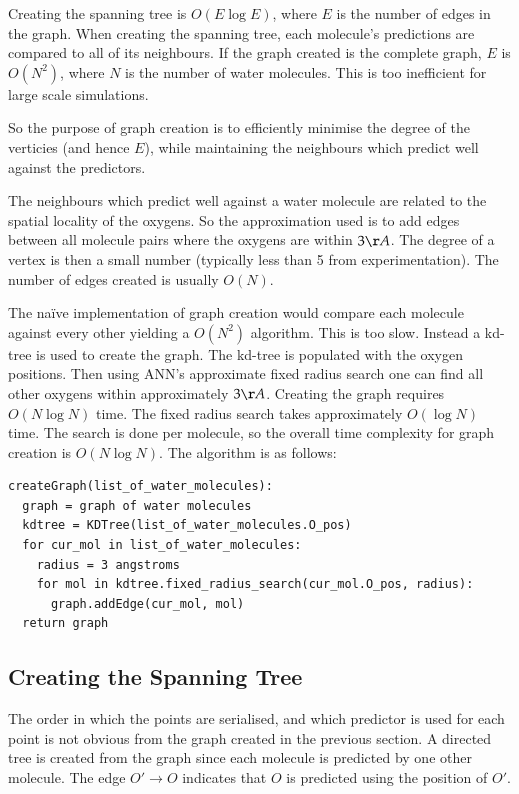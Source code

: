 \documentclass{report}
\begin{document}
Creating the spanning tree is $O(E \log E)$, where $E$ is the number of edges
in the graph. When creating the spanning tree, each molecule's predictions are
compared to all of its neighbours. If the graph created is the complete graph,
$E$ is $O(N^2)$, where $N$ is the number of water molecules. This is too
inefficient for large scale simulations.

So the purpose of graph creation is to efficiently minimise the degree of the
verticies (and hence $E$), while maintaining the neighbours which predict well
against the predictors.

The neighbours which predict well against a water molecule are related to the
spatial locality of the oxygens. So the approximation used is to add edges
between all molecule pairs where the oxygens are within $3\AA$. The degree of
a vertex is then a small number (typically less than 5 from
experimentation). The number of edges created is usually $O(N)$.

The na\"{i}ve implementation of graph creation would compare each molecule
against every other yielding a $O(N^2)$ algorithm. This is too slow. Instead a
kd-tree is used to create the graph. The kd-tree is populated with the oxygen
positions. Then using ANN's approximate fixed radius search one can find all
other oxygens within approximately $3\AA$. Creating the graph requires $O(N
\log N)$ time. The fixed radius search takes approximately $O(\log N)$
time. The search is done per molecule, so the overall time complexity for
graph creation is $O(N \log N)$. The algorithm is as follows:

\begin{verbatim}
createGraph(list_of_water_molecules):
  graph = graph of water molecules
  kdtree = KDTree(list_of_water_molecules.O_pos)
  for cur_mol in list_of_water_molecules:
    radius = 3 angstroms
    for mol in kdtree.fixed_radius_search(cur_mol.O_pos, radius):
      graph.addEdge(cur_mol, mol)
  return graph
\end{verbatim}



\subsection{Creating the Spanning Tree}

The order in which the points are serialised, and which predictor is used for
each point is not obvious from the graph created in the previous section. A
directed tree is created from the graph since each molecule is predicted by
one other molecule. The edge $O' \to O$ indicates that $O$ is predicted using
the position of $O'$.
\end{document}
